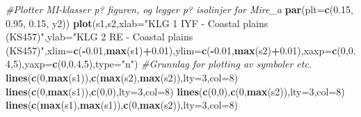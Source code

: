\documentclass[]{article}
\newenvironment{Shaded}{\begin{snugshade}}{\end{snugshade}}
\newcommand{\CommentTok}[1]{\textcolor[rgb]{0.56,0.35,0.01}{\textit{#1}}}
\newcommand{\DataTypeTok}[1]{\textcolor[rgb]{0.13,0.29,0.53}{#1}}
\newcommand{\DecValTok}[1]{\textcolor[rgb]{0.00,0.00,0.81}{#1}}
\newcommand{\FloatTok}[1]{\textcolor[rgb]{0.00,0.00,0.81}{#1}}
\newcommand{\KeywordTok}[1]{\textcolor[rgb]{0.13,0.29,0.53}{\textbf{#1}}}
\newcommand{\NormalTok}[1]{#1}
\newcommand{\OperatorTok}[1]{\textcolor[rgb]{0.81,0.36,0.00}{\textbf{#1}}}
\newcommand{\StringTok}[1]{\textcolor[rgb]{0.31,0.60,0.02}{#1}}
\begin{document}
\begin{Shaded}
\begin{Highlighting}[]
\CommentTok{#Plotter MI-klasser p? figuren, og legger p? isolinjer for Mire_a}
  \KeywordTok{par}\NormalTok{(}\DataTypeTok{plt=}\KeywordTok{c}\NormalTok{(}\FloatTok{0.15}\NormalTok{, }\FloatTok{0.95}\NormalTok{, }\FloatTok{0.15}\NormalTok{, y2))}
\KeywordTok{plot}\NormalTok{(s1,s2,}\DataTypeTok{xlab=}\StringTok{"KLG 1 IYF - Coastal plains (KS457)"}\NormalTok{,}\DataTypeTok{ylab=}\StringTok{"KLG 2 RE - Coastal plains (KS457)"}\NormalTok{,}\DataTypeTok{xlim=}\KeywordTok{c}\NormalTok{(}\OperatorTok{-}\FloatTok{0.01}\NormalTok{,}\KeywordTok{max}\NormalTok{(s1)}\OperatorTok{+}\FloatTok{0.01}\NormalTok{),}\DataTypeTok{ylim=}\KeywordTok{c}\NormalTok{(}\OperatorTok{-}\FloatTok{0.01}\NormalTok{,}\KeywordTok{max}\NormalTok{(s2)}\OperatorTok{+}\FloatTok{0.01}\NormalTok{),}\DataTypeTok{xaxp=}\KeywordTok{c}\NormalTok{(}\DecValTok{0}\NormalTok{,}\FloatTok{0.4}\NormalTok{,}\DecValTok{5}\NormalTok{),}\DataTypeTok{yaxp=}\KeywordTok{c}\NormalTok{(}\DecValTok{0}\NormalTok{,}\FloatTok{0.4}\NormalTok{,}\DecValTok{5}\NormalTok{),}\DataTypeTok{type=}\StringTok{"n"}\NormalTok{) }\CommentTok{#Grunnlag for plotting av symboler etc.}
\KeywordTok{lines}\NormalTok{(}\KeywordTok{c}\NormalTok{(}\DecValTok{0}\NormalTok{,}\KeywordTok{max}\NormalTok{(s1)),}\KeywordTok{c}\NormalTok{(}\KeywordTok{max}\NormalTok{(s2),}\KeywordTok{max}\NormalTok{(s2)),}\DataTypeTok{lty=}\DecValTok{3}\NormalTok{,}\DataTypeTok{col=}\DecValTok{8}\NormalTok{)}
\KeywordTok{lines}\NormalTok{(}\KeywordTok{c}\NormalTok{(}\DecValTok{0}\NormalTok{,}\KeywordTok{max}\NormalTok{(s1)),}\KeywordTok{c}\NormalTok{(}\DecValTok{0}\NormalTok{,}\DecValTok{0}\NormalTok{),}\DataTypeTok{lty=}\DecValTok{3}\NormalTok{,}\DataTypeTok{col=}\DecValTok{8}\NormalTok{)}
\KeywordTok{lines}\NormalTok{(}\KeywordTok{c}\NormalTok{(}\DecValTok{0}\NormalTok{,}\DecValTok{0}\NormalTok{),}\KeywordTok{c}\NormalTok{(}\DecValTok{0}\NormalTok{,}\KeywordTok{max}\NormalTok{(s2)),}\DataTypeTok{lty=}\DecValTok{3}\NormalTok{,}\DataTypeTok{col=}\DecValTok{8}\NormalTok{)}
\KeywordTok{lines}\NormalTok{(}\KeywordTok{c}\NormalTok{(}\KeywordTok{max}\NormalTok{(s1),}\KeywordTok{max}\NormalTok{(s1)),}\KeywordTok{c}\NormalTok{(}\DecValTok{0}\NormalTok{,}\KeywordTok{max}\NormalTok{(s2)),}\DataTypeTok{lty=}\DecValTok{3}\NormalTok{,}\DataTypeTok{col=}\DecValTok{8}\NormalTok{)}


\end{Highlighting}
\end{Shaded}
\end{document}
